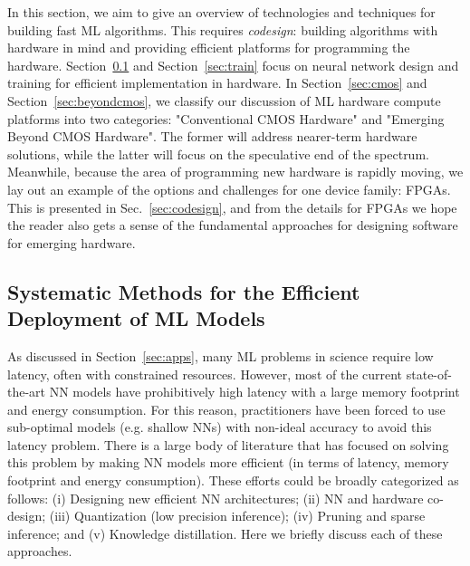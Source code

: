 In this section, we aim to give an overview of technologies and techniques for building fast ML algorithms. This requires {\it codesign}: building algorithms with hardware in mind and providing efficient platforms for programming the hardware.  Section~\ref{sec:deploy} and Section~\ref{sec:train} focus on neural network design and training for efficient implementation in hardware. In Section~\ref{sec:cmos} and Section~\ref{sec:beyondcmos}, we classify our discussion of ML hardware compute platforms into two categories: "Conventional CMOS Hardware" and "Emerging Beyond CMOS Hardware".  The former will address nearer-term hardware solutions, while the latter will focus on the speculative end of the spectrum. Meanwhile, because the area of programming new hardware is rapidly moving, we lay out an example of the options and challenges for one device family: FPGAs. This is presented in Sec.~\ref{sec:codesign}, and from the details for FPGAs we hope the reader also gets a sense of the fundamental approaches for designing software for emerging hardware.   


\subsection{Systematic Methods for the Efficient Deployment of ML Models}
\label{sec:deploy}

As discussed in Section~\ref{sec:apps}, many ML problems in science
require low latency, often with
constrained resources. However, most of the current state-of-the-art NN models have prohibitively high latency with a large
memory footprint and energy consumption. 
For this reason, practitioners have been forced to use sub-optimal models (e.g. shallow NNs)
with non-ideal accuracy to avoid this latency problem.
There is a large body of literature that has
focused on solving this problem by making NN models more efficient
(in terms of latency, memory footprint and energy consumption). These efforts could be broadly categorized as follows:
(i) Designing new efficient NN architectures;
(ii) NN and hardware co-design;
(iii) Quantization (low precision inference);
(iv) Pruning and sparse inference; and
(v) Knowledge distillation.
Here we briefly discuss each of these approaches.


